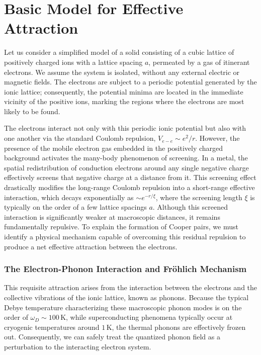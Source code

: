 \section{Basic Model for Effective Attraction}

Let us consider a simplified model of a solid consisting of a cubic lattice of positively charged ions with a lattice spacing \( a \), permeated by a gas of itinerant electrons. We assume the system is isolated, without any external electric or magnetic fields. The electrons are subject to a periodic potential generated by the ionic lattice; consequently, the potential minima are located in the immediate vicinity of the positive ions, marking the regions where the electrons are most likely to be found.

The electrons interact not only with this periodic ionic potential but also with one another via the standard Coulomb repulsion, \( V_{e-e} \sim e^2/r \). However, the presence of the mobile electron gas embedded in the positively charged background activates the many-body phenomenon of screening. In a metal, the spatial redistribution of conduction electrons around any single negative charge effectively screens that negative charge at a distance from it. This screening effect drastically modifies the long-range Coulomb repulsion into a short-range effective interaction, which decays exponentially as \( \sim e^{-r/\xi} \), where the screening length \( \xi \) is typically on the order of a few lattice spacings \( a \). Although this screened interaction is significantly weaker at macroscopic distances, it remains fundamentally repulsive. To explain the formation of Cooper pairs, we must identify a physical mechanism capable of overcoming this residual repulsion to produce a net effective attraction between the electrons.

\subsubsection{The Electron-Phonon Interaction and Fröhlich Mechanism}

This requisite attraction arises from the interaction between the electrons and the collective vibrations of the ionic lattice, known as phonons. Because the typical Debye temperature characterizing these macroscopic phonon modes is on the order of \( \omega_D \sim 100\,\text{K} \), while superconducting phenomena typically occur at cryogenic temperatures around \( 1\,\text{K} \), the thermal phonons are effectively frozen out. Consequently, we can safely treat the quantized phonon field as a perturbation to the interacting electron system.

